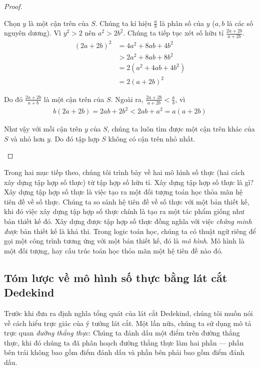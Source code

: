 \begin{proof}
\begin{enumerate}[label={(\roman*)}]
              Chọn $y$ là một cận trên của $S$. Chúng ta kí hiệu $\frac{a}{b}$ là phân số của $y$ ($a, b$ là các số nguyên dương). Vì $y^{2} > 2$ nên $a^{2} > 2b^{2}$. Chúng ta tiếp tục xét số hữu tỉ $\frac{2a + 2b}{a + 2b}$.
              \begin{align*}
                  {(2a + 2b)}^{2} & = 4a^{2} + 8ab + 4b^{2}   \\
                                  & > 2a^{2} + 8ab + 8b^{2}   \\
                                  & = 2(a^{2} + 4ab + 4b^{2}) \\
                                  & = 2{(a + 2b)}^{2}
              \end{align*}

              Do đó $\frac{2a + 2b}{a + b}$ là một cận trên của $S$. Ngoài ra, $\frac{2a + 2b}{a + 2b} < \frac{a}{b}$, vì
              \begin{align*}
                  b(2a + 2b) = 2ab + 2b^{2} < 2ab + a^{2} = a(a + 2b)
              \end{align*}

              Như vậy với mỗi cận trên $y$ của $S$, chúng ta luôn tìm được một cận trên khác của $S$ và nhỏ hơn $y$. Do đó tập hợp $S$ không có cận trên nhỏ nhất.
    \end{enumerate}
\end{proof}

Trong hai mục tiếp theo, chúng tôi trình bày về hai mô hình số thực (hai cách xây dựng tập hợp số thực) từ tập hợp số hữu tỉ. Xây dựng tập hợp số thực là gì? Xây dựng tập hợp số thực là việc tạo ra một đối tượng toán học thỏa mãn hệ tiên đề về số thực. Chúng ta so sánh hệ tiên đề về số thực với một bản thiết kế, khi đó việc xây dựng tập hợp số thực chính là tạo ra một tác phẩm giống như bản thiết kế đó. Xây dựng được tập hợp số thực đồng nghĩa với việc \textit{chứng minh được} bản thiết kế là khả thi. Trong logic toán học, chúng ta có thuật ngữ riêng để gọi một công trình tương ứng với một bản thiết kế, đó là \textit{mô hình}. Mô hình là một đối tượng, hay cấu trúc toán học thỏa mãn một hệ tiên đề nào đó.

\subsection{Tóm lược về mô hình số thực bằng lát cắt Dedekind}

Trước khi đưa ra định nghĩa tổng quát của lát cắt Dedekind, chúng tôi muốn nói về cách hiểu trực giác của ý tưởng lát cắt. Một lần nữa, chúng ta sử dụng mô tả trực quan \textit{đường thẳng thực}: Chúng ta đánh dấu một điểm trên đường thẳng thực, khi đó chúng ta đã phân hoạch đường thẳng thực làm hai phần --- phần bên trái không bao gồm điểm đánh dấu và phần bên phải bao gồm điểm đánh dấu.

